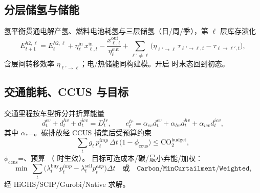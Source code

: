 \documentclass[UTF8,fontset=fandol,a4paper,11pt]{ctexart}
\begin{document}
\subsection{分层储氢与储能}
氢平衡贯通电解产氢、燃料电池耗氢与三层储氢（日/周/季），第 $\ell$ 层库存演化
\begin{equation}
E^{h2,\ell}_{t+1} = E^{h2,\ell}_{t}
 + \eta^{\text{in}}_{\ell}\, x^{\text{in}}_{\ell,t}
 - \frac{x^{\text{out}}_{\ell,t}}{\eta^{\text{out}}_{\ell}}
 + \sum_{\ell'\neq\ell}\bigl(\eta_{\ell'\to\ell}\, \tau_{\ell'\to\ell,t} - \tau_{\ell\to\ell',t}\bigr),
\end{equation}
含层间转移效率 $\eta_{\ell'\to\ell}$；电/热储能同构建模。开启
 时末态回到初态。

\subsection{交通能耗、CCUS 与目标}
交通里程按车型拆分并折算能量
\begin{equation}
d^{ev}_t + d^{hv}_t + d^{icv}_t = D^{tr}_t,\qquad
e^{tr}_t = \alpha_{ev}d^{ev}_t + \alpha_{hv}d^{hv}_t + \alpha_{icv}d^{icv}_t,
\end{equation}
其中 $\alpha_{*}$=。碳排放经 CCUS 捕集后受预算约束
\begin{equation}
\sum_t g_t\, p^{imp}_t\, \Delta t\, \bigl(1-\phi_{\text{ccus}}\bigr) \le \text{CO}_2^{\text{budget}},
\end{equation}
$\phi_{\text{ccus}}$=、预算 （ 时生效）。
目标可选成本/碳/最小弃能/加权：
\begin{equation}
\min\ \sum_t \bigl(\lambda^{\text{buy}}_t p^{imp}_t - \lambda^{\text{sell}}_t p^{exp}_t\bigr)\Delta t
\quad\text{或}\quad \texttt{Carbon}/\texttt{MinCurtailment}/\texttt{Weighted},
\end{equation}
经 HiGHS/SCIP/Gurobi/Native 求解。
\end{document}

